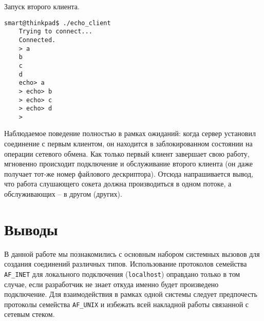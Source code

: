 Запуск второго клиента.
\begin{Verbatim}[frame=single,breaklines=true,breakanywhere=true]
    smart@thinkpad$ ./echo_client 
    Trying to connect...
    Connected.
    > a
    b
    c
    d
    echo> a
    > echo> b
    > echo> c
    > echo> d
    > 
\end{Verbatim}

Наблюдаемое поведение полностью в рамках ожиданий: когда сервер установил соединение с первым клиентом, он находится в заблокированном состоянии на операции сетевого обмена. Как только первый клиент завершает свою работу, мгновенно происходит подключение и обслуживание второго клиента (он даже получает тот-же номер файлового дескриптора). Отсюда напрашивается вывод, что работа слушающего сокета должна производиться в одном потоке, а обслуживающих -- в другом (других).

\section*{Выводы}

В данной работе мы познакомились с основным набором системных вызовов для создания соединений различных типов. Использование протоколов семейства \texttt{AF\_INET} для локального подключения (\texttt{localhost}) оправдано только в том случае, если разработчик не знает откуда именно будет произведено подключение. Для взаимодействия в рамках одной системы следует предпочесть протоколы семейства \texttt{AF\_UNIX} и избежать всей накладной работы связанной с сетевым стеком.
